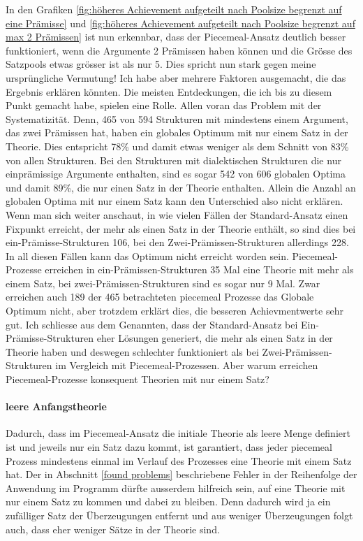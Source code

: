 \documentclass{article}
\begin{document}
In den Grafiken \ref{fig:höheres Achievement aufgeteilt nach Poolsize begrenzt auf eine Prämisse} und \ref{fig:höheres Achievement aufgeteilt nach Poolsize begrenzt auf max 2 Prämissen} ist nun erkennbar, dass der Piecemeal-Ansatz deutlich besser funktioniert, wenn die Argumente 2 Prämissen haben können und die Grösse des Satzpools etwas grösser ist als nur 5. Dies spricht nun stark gegen meine ursprüngliche Vermutung! Ich habe aber mehrere Faktoren ausgemacht, die das Ergebnis erklären könnten. Die meisten Entdeckungen, die ich bis zu diesem Punkt gemacht habe, spielen eine Rolle. Allen voran das Problem mit der Systematizität. Denn, 465 von 594 Strukturen mit mindestens einem Argument, das zwei Prämissen hat, haben ein globales Optimum mit nur einem Satz in der Theorie. Dies entspricht 78\% und damit etwas weniger als dem Schnitt von 83\% von allen Strukturen. Bei den Strukturen mit dialektischen Strukturen die nur einprämissige Argumente enthalten, sind es sogar 542 von 606 globalen Optima und damit 89\%, die nur einen Satz in der Theorie enthalten. Allein die Anzahl an globalen Optima mit nur einem Satz kann den Unterschied also nicht erklären. Wenn man sich weiter anschaut, in wie vielen Fällen der Standard-Ansatz einen Fixpunkt erreicht, der mehr als einen Satz in der Theorie enthält, so sind dies bei ein-Prämisse-Strukturen 106, bei den Zwei-Prämissen-Strukturen allerdings 228. In all diesen Fällen kann das Optimum nicht erreicht worden sein. Piecemeal-Prozesse erreichen in ein-Prämissen-Strukturen 35 Mal eine Theorie mit mehr als einem Satz, bei zwei-Prämissen-Strukturen sind es sogar nur 9 Mal. Zwar erreichen auch 189 der 465 betrachteten piecemeal Prozesse das Globale Optimum nicht, aber trotzdem erklärt dies, die besseren Achievmentwerte sehr gut. Ich schliesse aus dem Genannten, dass der Standard-Ansatz bei Ein-Prämisse-Strukturen eher Lösungen generiert, die mehr als einen Satz in der Theorie haben und deswegen schlechter funktioniert als bei Zwei-Prämissen-Strukturen im Vergleich mit Piecemeal-Prozessen. Aber warum erreichen Piecemeal-Prozesse konsequent Theorien mit nur einem Satz?

\paragraph{leere Anfangstheorie} Dadurch, dass im Piecemeal-Ansatz die initiale Theorie als leere Menge definiert ist und jeweils nur ein Satz dazu kommt, ist garantiert, dass jeder piecemeal Prozess mindestens einmal im Verlauf des Prozesses eine Theorie mit einem Satz hat. Der in Abschnitt \ref{found problems} beschriebene Fehler in der Reihenfolge der Anwendung im Programm dürfte ausserdem hilfreich sein, auf eine Theorie mit nur einem Satz zu kommen und dabei zu bleiben. Denn dadurch wird ja ein zufälliger Satz der Überzeugungen entfernt und aus weniger Überzeugungen folgt auch, dass eher weniger Sätze in der Theorie sind.
\end{document}
